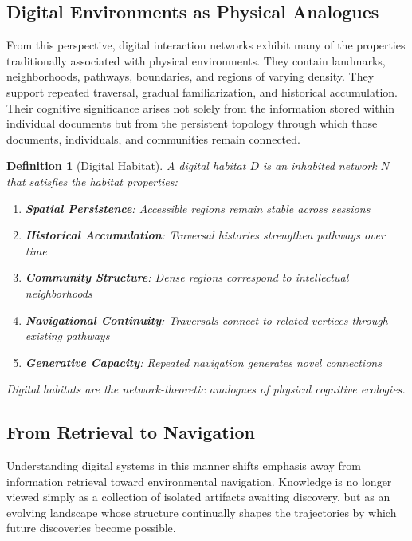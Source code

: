 \documentclass[12pt,oneside]{article}
\newtheorem{definition}{Definition}[section]
\theoremstyle{remark}
\begin{document}
\subsection{Digital Environments as Physical Analogues}

From this perspective, digital interaction networks exhibit many of the properties traditionally associated with physical environments. They contain landmarks, neighborhoods, pathways, boundaries, and regions of varying density. They support repeated traversal, gradual familiarization, and historical accumulation. Their cognitive significance arises not solely from the information stored within individual documents but from the persistent topology through which those documents, individuals, and communities remain connected.

\begin{definition}[Digital Habitat]
A digital habitat $D$ is an inhabited network $N$ that satisfies the habitat properties:

\begin{enumerate}
\item \textbf{Spatial Persistence}: Accessible regions remain stable across sessions
\item \textbf{Historical Accumulation}: Traversal histories strengthen pathways over time
\item \textbf{Community Structure}: Dense regions correspond to intellectual neighborhoods
\item \textbf{Navigational Continuity}: Traversals connect to related vertices through existing pathways
\item \textbf{Generative Capacity}: Repeated navigation generates novel connections
\end{enumerate}

Digital habitats are the network-theoretic analogues of physical cognitive ecologies.
\end{definition}

\subsection{From Retrieval to Navigation}

Understanding digital systems in this manner shifts emphasis away from information retrieval toward environmental navigation. Knowledge is no longer viewed simply as a collection of isolated artifacts awaiting discovery, but as an evolving landscape whose structure continually shapes the trajectories by which future discoveries become possible.
\end{document}
